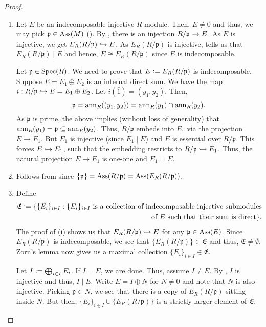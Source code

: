 \begin{proof} 
	\phantom{hi}
	\begin{enumerate}[leftmargin=*]
		\item \forward Let $E$ be an indecomposable injective $R$-module. Then, $E \neq 0$ and thus, we may pick $\mathfrak{p} \in \operatorname{Ass}(M)$ (). By , there is an injection $R/\mathfrak{p} \hookrightarrow E$. As $E$ is injective, we get $E_{R}(R/\mathfrak{p}) \hookrightarrow E$. As $E_{R}(R/\mathfrak{p})$ is injective,  tells us that $E_{R}(R/\mathfrak{p}) \mid E$ and hence, $E \cong E_{R}(R/\mathfrak{p})$ since $E$ is indecomposable. 

		\backward Let $\mathfrak{p} \in \operatorname{Spec}(R)$. We need to prove that $E \vcentcolon= E_{R}(R/\mathfrak{p})$ is indecomposable. Suppose $E = E_{1} \oplus E_{2}$ is an internal direct sum. We have the map $i : R/\mathfrak{p} \hookrightarrow E = E_{1} \oplus E_{2}$. Let $i(\bar{1}) = (y_{1}, y_{2})$. Then, 
		\begin{equation*} 
			\mathfrak{p} = \operatorname{ann}_{R}((y_{1}, y_{2})) = \operatorname{ann}_{R}(y_{1}) \cap \operatorname{ann}_{R}(y_{2}).
		\end{equation*}
		As $\mathfrak{p}$ is prime, the above implies (without loss of generality) that $\operatorname{ann}_{R}(y_{1}) = \mathfrak{p} \subseteq \operatorname{ann}_{R}(y_{2})$. Thus, $R/\mathfrak{p}$ embeds into $E_{1}$ via the projection $E \to E_{1}$. But $E_{1}$ is injective (since $E_{1} \mid E$) and $E$ is essential over $R/\mathfrak{p}$. This forces $E \hookrightarrow E_{1}$, such that the embedding restricts to $R/\mathfrak{p} \hookrightarrow E_{1}$. Thus, the natural projection $E \to E_{1}$ is one-one and $E_{1} = E$.
		\item Follows from  since $\{\mathfrak{p}\} = \operatorname{Ass}(R/\mathfrak{p}) = \operatorname{Ass}(E_{R}(R/\mathfrak{p}))$.
		\item Define 
		\begin{align*} 
			\mathfrak{E} \vcentcolon= \{\{E_{i}\}_{i \in I} : \{E_{i}\}_{i \in I} \text{ is a collection of indecomposable injective submodules} \\
			\text{of $E$ such that their sum is direct}\}.
		\end{align*}
		The proof of (i) shows us that $E_{R}(R/\mathfrak{p}) \hookrightarrow E$ for any $\mathfrak{p} \in \operatorname{Ass}(E)$. Since $E_{R}(R/\mathfrak{p})$ is indecomposable, we see that $\{E_{R}(R/\mathfrak{p})\} \in \mathfrak{E}$ and thus, $\mathfrak{E} \neq \emptyset$. Zorn's lemma now gives us a maximal collection $\{E_{i}\}_{i \in I} \in \mathfrak{E}$.

		Let $I \vcentcolon= \bigoplus_{i \in I} E_{i}$. If $I = E$, we are done. Thus, assume $I \neq E$. By , $I$ is injective and thus, $I \mid E$. Write $E = I \oplus N$ for $N \neq 0$ and note that $N$ is also injective. Picking $\mathfrak{p} \in N$, we see that there is a copy of $E_{R}(R/\mathfrak{p})$ sitting inside $N$. But then, $\{E_{i}\}_{i \in I} \cup \{E_{R}(R/\mathfrak{p})\}$ is a strictly larger element of $\mathfrak{E}$.
	\end{enumerate}
\end{proof}

